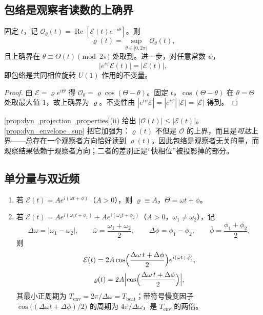 \subsection{包络是观察者读数的上确界}

\begin{proposition}[上确界与不变性]\label{prop:dyn_envelope_sup}
固定 $t$，记 $\mathcal O_\theta(t)=\operatorname{Re}[\mathcal E(t)e^{-i\theta}]$。则
\[
\varrho(t)=\sup_{\theta\in[0,2\pi)}\mathcal O_\theta(t),
\]
且上确界在 $\theta\equiv\Theta(t)\pmod{2\pi}$ 处取到。进一步，对任意常数 $\psi$，
\[
\bigl|e^{i\psi}\mathcal E(t)\bigr|=|\mathcal E(t)|,
\]
即包络是共同相位旋转 $U(1)$ 作用的不变量。
\end{proposition}

\begin{proof}
由 $\mathcal E=\varrho e^{i\Theta}$ 得 $\mathcal O_\theta=\varrho\cos(\Theta-\theta)$。固定 $t$，$\cos(\Theta-\theta)$ 在 $\theta=\Theta$ 处取最大值 $1$，故上确界为 $\varrho$。不变性由 $|e^{i\psi}\mathcal E|=|e^{i\psi}|\,|\mathcal E|=|\mathcal E|$ 得到。
\end{proof}

\begin{remark}[包络与投影的关系]\label{rem:dyn_envelope_vs_projection}
\cref{prop:dyn_projection_properties}(ii) 给出 $|\mathcal O(t)|\le|\mathcal E(t)|$。\cref{prop:dyn_envelope_sup} 把它加强为：$\varrho(t)$ 不但是 $\mathcal O$ 的上界，而且是\emph{可达}上界——总存在一个观察者方向恰好读到 $\varrho(t)$。因此包络是观察者无关的量，而观察结果依赖于观察者方向；二者的差别正是“快相位”被投影掉的部分。
\end{remark}

\subsection{单分量与双近频}

\begin{proposition}[单分量与拍]\label{prop:dyn_envelope_beat}
\begin{enumerate}[label=(\roman*)]
    \item 若 $\mathcal E(t)=Ae^{i(\omega t+\phi)}$（$A>0$），则 $\varrho\equiv A$，$\Theta=\omega t+\phi$。
    \item 若 $\mathcal E(t)=Ae^{i(\omega_1t+\phi_1)}+Ae^{i(\omega_2t+\phi_2)}$（$A>0$，$\omega_1\neq\omega_2$），记
    \[
    \Delta\omega=|\omega_1-\omega_2|,\qquad \bar\omega=\frac{\omega_1+\omega_2}{2},\qquad \Delta\phi=\phi_1-\phi_2,\qquad \bar\phi=\frac{\phi_1+\phi_2}{2},
    \]
    则
    \[
    \mathcal E(t)=2A\cos\Bigl(\frac{\Delta\omega\,t+\Delta\phi}{2}\Bigr)e^{i(\bar\omega t+\bar\phi)},
    \]
    \[
    \varrho(t)=2A\Bigl|\cos\Bigl(\frac{\Delta\omega\,t+\Delta\phi}{2}\Bigr)\Bigr|,
    \]
    其最小正周期为 $T_{\text{env}}=2\pi/\Delta\omega=T_{\text{beat}}$；带符号慢变因子 $\cos\bigl((\Delta\omega t+\Delta\phi)/2\bigr)$ 的周期为 $4\pi/\Delta\omega$，是 $T_{\text{env}}$ 的两倍。
\end{enumerate}
\end{proposition}

